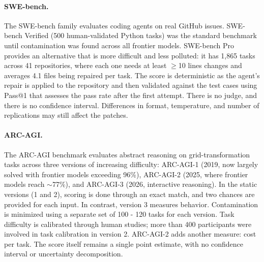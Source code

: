 \paragraph{SWE-bench.} The SWE-bench family \citep{jimenez2024swebench} evaluates coding agents on real GitHub issues. SWE-bench Verified (500 human-validated Python tasks) was the standard benchmark until contamination was found across all frontier models. SWE-bench Pro provides an alternative that is more difficult and less polluted: it has 1,865 tasks across 41 repositories, where each one needs at least $\geq$10 lines changes and averages 4.1 files being repaired per task. The score is deterministic as the agent's repair is applied to the repository and then validated against the test cases using Pass@1 that assesses the pass rate after the first attempt. There is no judge, and there is no confidence interval. Differences in format, temperature, and number of replications may still affect the patches.

\paragraph{ARC-AGI.} The ARC-AGI benchmark \citep{chollet2024arcagi} evaluates abstract reasoning on grid-transformation tasks across three versions of increasing difficulty: ARC-AGI-1 (2019, now largely solved with frontier models exceeding 96\%), ARC-AGI-2 (2025, where frontier models reach $\sim$77\%), and ARC-AGI-3 (2026, interactive reasoning). In the static versions (1 and 2), scoring is done through an exact match, and two chances are provided for each input. In contrast, version 3 measures behavior. Contamination is minimized using a separate set of 100 - 120 tasks for each version. Task difficulty is calibrated through human studies; more than 400 participants were involved in task calibration in version 2. ARC-AGI-2 adds another measure: cost per task. The score itself remains a single point estimate, with no confidence interval or uncertainty decomposition.

